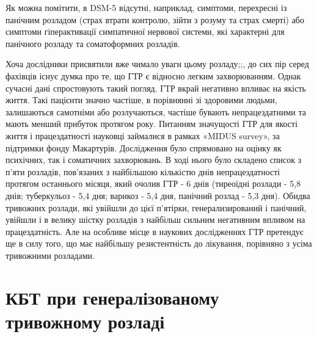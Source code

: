 \documentclass[twocolumn]{article}
\begin{document}
\par Як можна помітити, в DSM-5 відсутні, наприклад, симптоми, перехресні із панічним розладом (страх втрати контролю, зійти з розуму та страх смерті) або симптоми гіперактивації симпатичної нервової системи, які характерні для панічного розладу та соматоформних розладів.
\par Хоча дослідники присвятили вже чимало уваги цьому розладу\cite{bib7};\cite{bib8};\cite{bib9}, до сих пір серед фахівців існує думка про те, що ГТР є відносно легким захворюванням. Однак сучасні дані спростовують такий погляд. ГТР вкрай негативно впливає на якість життя. Такі пацієнти значно частіше, в порівнянні зі здоровими людьми, залишаються самотніми або розлучаються, частіше бувають непрацездатними та мають менший прибуток протягом року\cite{bib10}. Питанням значущості ГТР для якості життя і працездатності науковці займалися в рамках «MIDUS survey», за підтримки фонду Макартурів. Дослідження було спрямовано на оцінку як психічних, так і соматичних захворювань\cite{bib11}. В ході нього було складено список з п'яти розладів, пов'язаних з найбільшою кількістю днів непрацездатності протягом останнього місяця, який очолив ГТР - 6 днів (тиреоїдні розлади - 5,8 днів; туберкульоз - 5,4 дня; варикоз - 5,4 дня, панічний розлад - 5,3 дня). Обидва тривожних розлади, які увійшли до цієї п'ятірки, генерализирований і панічний, увійшли і в велику шістку розладів з найбільш сильним негативним впливом на працездатність. Але на особливе місце в наукових дослідженнях ГТР претендує ще в силу того, що має найбільшу резистентність до лікування, порівняно з усіма тривожними розладами.
\section{КБТ при генералізованому тривожному розладі}
\end{document}
